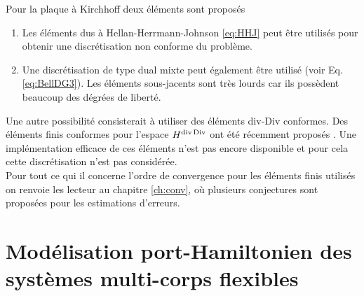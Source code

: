 Pour la plaque à Kirchhoff deux éléments sont proposés
\begin{enumerate}
	\item Les éléments dus à Hellan-Herrmann-Johnson \eqref{eq:HHJ} \cite{hellan1967,herrmann1967finite,johnson1973convergence} peut être utilisés pour obtenir une discrétisation non conforme du problème.
	\item Une discrétisation de type dual mixte peut également être utilisé (voir Eq. \eqref{eq:BellDG3}). Les éléments sous-jacents sont très lourds car ils possèdent beaucoup des dégrées de liberté.
\end{enumerate}

Une autre possibilité consisterait à utiliser des éléments div-Div conformes. Des éléments finis conformes pour l'espace $ H^{\operatorname{div}\operatorname*{Div}} $ ont été récemment proposés \cite{chen2020divDiv}. Une implémentation efficace de ces éléments n'est pas encore disponible et pour cela cette discrétisation n'est pas considérée. \\

Pour tout ce qui il concerne l'ordre de convergence pour les éléments finis utilisés on renvoie les lecteur au chapitre \ref{ch:conv}, où plusieurs conjectures sont proposées pour les estimations d'erreurs.


\section{Modélisation port-Hamiltonien des systèmes multi-corps flexibles}

